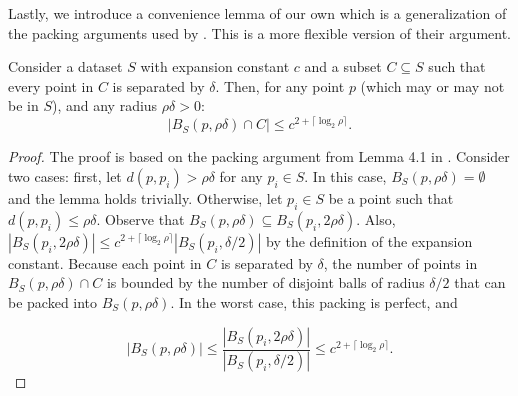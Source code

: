
Lastly, we introduce a convenience lemma of our own which is a generalization of
the packing arguments used by \citet{langford2006}.  This is a more flexible
version of their argument.

\begin{lemma}
Consider a dataset $S$ with expansion constant $c$ and a subset $C \subseteq S$
such that every point in $C$ is separated by $\delta$.  Then, for any point
$p$ (which may or may not be in $S$), and any radius $\rho \delta > 0$:
\begin{equation}
| B_S(p, \rho \delta) \cap C | \le c^{2 + \lceil \log_2 \rho \rceil}.
\end{equation}
\label{lem:packing}
\end{lemma}

\begin{proof}
The proof is based on the packing argument from Lemma 4.1 in
\cite{langford2006}. Consider two cases: first, let $d(p, p_i) > \rho \delta$
for any $p_i \in S$. In this case, $B_S(p, \rho \delta) = \emptyset$ and the
lemma holds trivially.
Otherwise, let $p_i \in S$ be a point such that $d(p, p_i) \leq \rho \delta$.
Observe that $B_S(p, \rho \delta) \subseteq B_S(p_i, 2 \rho \delta)$.
Also, $| B_S(p_i, 2 \rho \delta) | \le c^{2 + \lceil \log_2 \rho
\rceil} | B_S(p_i, \delta / 2) |$ by the definition of the expansion constant.
Because each point in $C$ is separated by $\delta$, the
number of points in $B_S(p, \rho \delta) \cap C$ is
bounded by the number of disjoint balls of radius $\delta / 2$ that can be
packed into $B_S(p, \rho \delta)$.  In the worst case, this packing is
perfect, and

\begin{equation}
|B_S(p, \rho \delta)| \le \frac{|B_S(p_i, 2 \rho \delta)|}{|B_S(p_i, \delta
/ 2)|} \le c^{2 + \lceil \log_2 \rho \rceil}.
\end{equation}
\end{proof}
